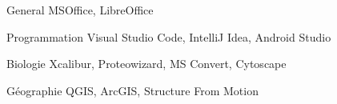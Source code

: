 

\begin{cvpairs}

  
\cvpair
    {General} %
    {MSOffice, LibreOffice} %

  
\cvpair
    {Programmation} %
    {Visual Studio Code, IntelliJ Idea, Android Studio} %

  
\cvpair
    {Biologie} %
    {Xcalibur, Proteowizard, MS Convert, Cytoscape} %

  
\cvpair
    {Géographie} %
    {QGIS, ArcGIS, Structure From Motion} %

\end{cvpairs}